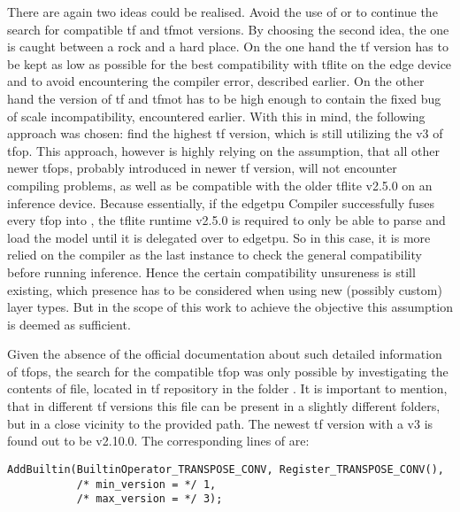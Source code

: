{There are again two ideas could be realised. Avoid the use of  or to continue the search for compatible \gls{tf} and \gls{tfmot} versions.
By choosing the second idea, the one is caught between a rock and a hard place. On the one hand the \gls{tf} version has to be kept as low as possible for the best compatibility with
\gls{tflite} on the edge device and to avoid encountering the  compiler error, described earlier. On the other hand the version of \gls{tf} and \gls{tfmot}
has to be high enough to contain the fixed bug of scale incompatibility, encountered earlier. With this in mind, the following approach was chosen: find the highest \gls{tf} version,
which is still utilizing the v3 of  \gls{tfop}. This approach, however is highly relying on the assumption, that all other newer \glspl{tfop},
probably introduced in newer \gls{tf} version, will not encounter compiling problems, as well as be compatible with the older \gls{tflite} v2.5.0 on an inference device.
Because essentially, if the \gls{edgetpu} Compiler successfully fuses every \gls{tfop} into ,
the \gls{tflite} runtime v2.5.0 is required to only be able to parse and load the model until it is delegated over to \gls{edgetpu}.
So in this case, it is more relied on the compiler as the last instance to check the general compatibility before running inference.
Hence the certain compatibility unsureness is still existing, which presence has to be considered when using new (possibly custom) layer types.
But in the scope of this work to achieve the objective this assumption is deemed as sufficient.

Given the absence of the official documentation about such detailed information of \glspl{tfop},
the search for the compatible  \gls{tfop} was only possible by investigating the contents of  file,
located in \gls{tf} repository in the folder . It is important to mention,
that in different \gls{tf} versions this file can be present in a slightly different folders, but in a close vicinity to the provided path.
The newest \gls{tf} version with a  v3 is found out to be v2.10.0. The corresponding lines of  are:

\begin{lstlisting}
AddBuiltin(BuiltinOperator_TRANSPOSE_CONV, Register_TRANSPOSE_CONV(),
           /* min_version = */ 1,
           /* max_version = */ 3);
\end{lstlisting}

}
